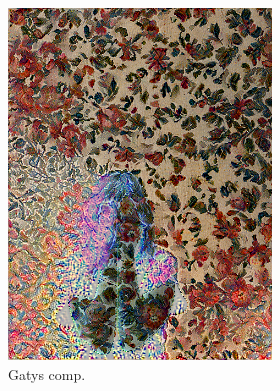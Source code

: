 \begin{figure}[]
\begin{subfigure}{\textwidth}
\begin{subfigure}{0.24\textwidth}
            \includegraphics[width=\textwidth]{images/04-experiment02/human/flowers/gatys_im.jpg}
            \caption*{Gatys comp.}
        \end{subfigure}
        \hfill
        \begin{subfigure}{0.24\textwidth}
            \centering

\end{subfigure}
\end{subfigure}
\end{figure}
